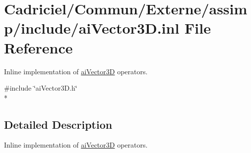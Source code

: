 \hypertarget{ai_vector3_d_8inl}{\section{Cadriciel/\-Commun/\-Externe/assimp/include/ai\-Vector3\-D.inl File Reference}
\label{ai_vector3_d_8inl}
}


Inline implementation of \hyperlink{structai_vector3_d}{ai\-Vector3\-D} operators.  


{\ttfamily \#include \char`\"{}ai\-Vector3\-D.\-h\char`\"{}}\\*


\subsection{Detailed Description}
Inline implementation of \hyperlink{structai_vector3_d}{ai\-Vector3\-D} operators. 